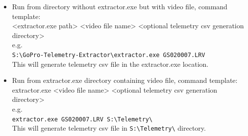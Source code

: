\documentclass[a4paper,12pt]{book}
\begin{document}
\begin{enumerate}
\begin{itemize}
		This will generate telemetry csv file in \verb|S:\Telemetry\| directory.
		\item Run from directory without extractor.exe but with video file, command template:\\
		<extractor.exe path> <video file name> <optional telemetry csv generation directory>\\
		e.g.\\
		\verb|S:\GoPro-Telemetry-Extractor\extractor.exe GS020007.LRV|\\
		
		This will generate telemetry csv file in the extractor.exe location.
		\item Run from extractor.exe directory containing video file, command template:\\
		extractor.exe <video file name> <optional telemetry csv generation directory>\\
		e.g.\\
		\verb|extractor.exe GS020007.LRV S:\Telemetry\|\\
		This will generate telemetry csv file in \verb|S:\Telemetry\| directory.		
	\end{itemize}
\end{enumerate}
 
\end{document}
